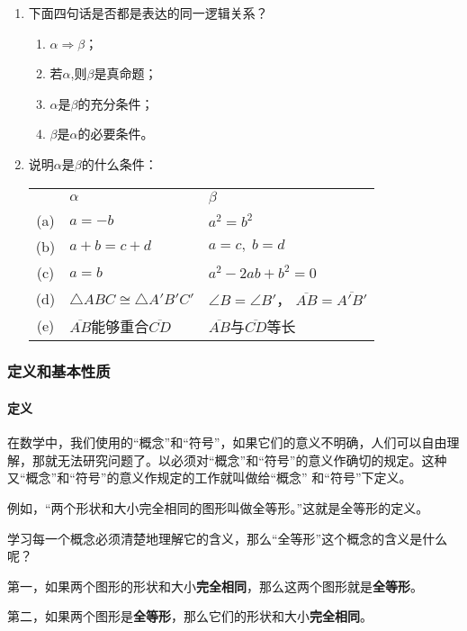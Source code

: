 \begin{ex}
	\begin{enumerate}
		\item 下面四句话是否都是表达的同一逻辑关系？
		\begin{enumerate}
			\item $\alpha\Rightarrow\beta$；
			\item 若$\alpha$,则$\beta$是真命题；
			\item $\alpha$是$\beta$的充分条件；
			\item $\beta$是$\alpha$的必要条件。
		\end{enumerate}
		
		\item 说明$\alpha$是$\beta$的什么条件：
		
		\begin{tabular}{cll}
			& $\alpha$ &$\beta$\\
			(a)& $a=-b$ &$a^2=b^2$\\
			(b)& $a+b=c+d$ & $a=c,\; b=d$\\
			(c)& $a=b$ & $a^2-2ab+b^2=0$\\
			(d)& $\triangle ABC\cong \triangle A'B'C'$ & $\angle B=\angle B'$，
			$\overline{AB}=\overline{A'B'}$\\
			(e)&  $\overline{AB}$能够重合$\overline{CD}$
			& $\overline{AB}$与$\overline{CD}$等长
		\end{tabular}
	\end{enumerate}
\end{ex}

\subsubsection{定义和基本性质}
\paragraph{定义}
在数学中，我们使用的“概念”和“符号”，如果它们的意义不明确，人们可以自由理解，那就无法研究问题了。以必须对“概念”和“符号”的意义作确切的规定。这种又“概念”和“符号”的意义作规定的工作就叫做给“概念”
和“符号”下定义。

例如，“两个形状和大小完全相同的图形叫做全等形。”这就是全等形的定义。

学习每一个概念必须清楚地理解它的含义，那么“全等形”这个概念的含义是什么呢？

第一，如果两个图形的形状和大小\textbf{完全相同}，那么这两个图形就是\textbf{全等形}。

第二，如果两个图形是\textbf{全等形}，那么它们的形状和大小\textbf{完全相同}。

